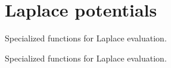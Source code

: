 \section{Laplace potentials}
\label{group__laplace}


Specialized functions for Laplace evaluation.  


Specialized functions for Laplace evaluation. 

